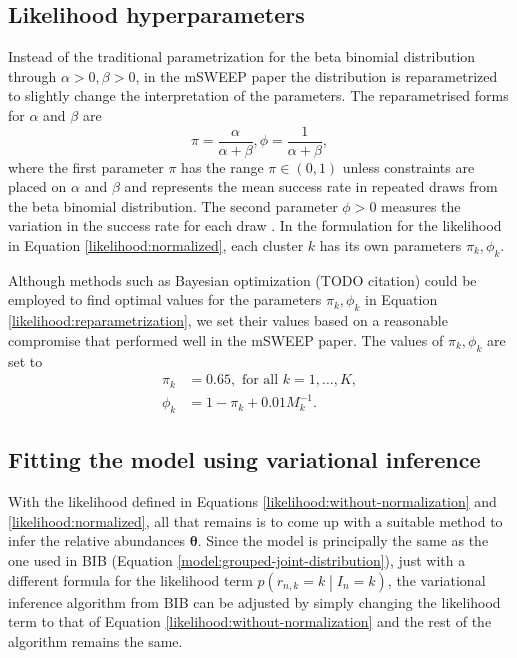 \documentclass[officiallayout]{tktla}
\begin{document}
\subsection{Likelihood hyperparameters}

Instead of the traditional parametrization for the beta binomial
distribution through $\alpha >0, \beta > 0$, in the mSWEEP paper the
distribution is reparametrized to slightly change the interpretation
of the parameters. The reparametrised forms for $\alpha$ and $\beta$ are
\begin{equation}
  \label{likelihood:reparametrization}
  \pi = \frac{\alpha}{\alpha + \beta}, \phi = \frac{1}{\alpha + \beta},
\end{equation}
where the first parameter $\pi$ has the range $\pi \in \left(0,
1\right)$ unless constraints are placed on $\alpha$ and $\beta$ and
represents the mean success rate in repeated draws from the beta
binomial distribution. The second parameter $\phi > 0$ measures
the variation in the success rate for each draw
\citep{griffiths1973maximum}. In the formulation for the likelihood in
Equation \eqref{likelihood:normalized}, each cluster $k$ has its own
parameters $\pi_{k}, \phi_{k}$.

Although methods such as Bayesian optimization (TODO citation) could
be employed to find optimal values for the parameters $\pi_{k},
\phi_{k}$ in Equation \eqref{likelihood:reparametrization}, we set their
values based on a reasonable compromise that performed well in the
mSWEEP paper. The values of $\pi_{k}, \phi_{k}$ are set to
\begin{equation}
  \begin{aligned}
    \pi_k &= 0.65, \text{ for all } k = 1, \dots, K, \\
    \phi_{k} &= 1 - \pi_{k} + 0.01M_{k}^{-1}.
  \end{aligned}
\end{equation}

\subsection{Fitting the model using variational inference}

With the likelihood defined in Equations
\eqref{likelihood:without-normalization} and
\eqref{likelihood:normalized}, all that remains is to come up with a
suitable method to infer the relative abundances
$\boldsymbol\theta$. Since the model is principally the same as the
one used in BIB (Equation \eqref{model:grouped-joint-distribution}),
just with a different formula for the likelihood term $p\left(r_{n, k}
= k \middle| I_{n} = k\right)$, the variational inference algorithm
from BIB can be adjusted by simply changing the likelihood term to
that of Equation \eqref{likelihood:without-normalization} and the rest of
the algorithm remains the same.
\end{document}
